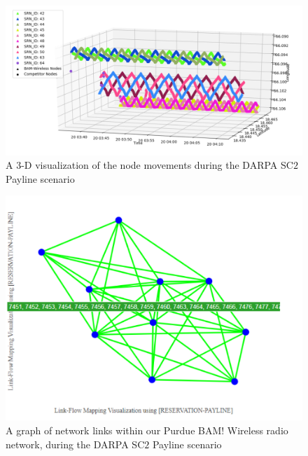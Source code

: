 \documentclass{article}
\begin{document}
\begin{figure}
    \centering
    \includegraphics[width = 1.0\textwidth]{Payline_Node_GPS_Locations.PNG}
    \caption{A $3$-D visualization of the node movements during the DARPA SC$2$ Payline scenario}
    \label{fig:1}
\end{figure}

\begin{figure}
    \centering
    \includegraphics[width = 1.0\textwidth]{Network_Graph_Payline.PNG}
    \caption{A graph of network links within our Purdue BAM! Wireless radio network, during the DARPA SC$2$ Payline scenario}
    \label{fig:2}
\end{figure}
\end{document}
